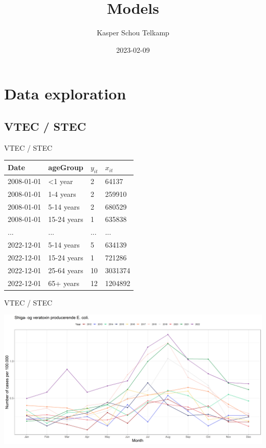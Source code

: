 \documentclass[aspectratio=169]{beamer}
\title[Automated and Early Detection of Disease Outbreaks]{Models}
\author{Kasper Schou Telkamp}
\institute{Section for Dynamical Systems}
\date{2023-02-09}
\begin{document}
\frame{
	\maketitle
}


\hypertarget{data-exploration}{%
\section{Data exploration}\label{data-exploration}}

\hypertarget{vtec-stec}{%
\subsection*{VTEC / STEC}\label{vtec-stec}}

\begin{frame}{VTEC / STEC}
\tiny

\begin{table}
\centering\begingroup\fontsize{12}{14}\selectfont

\begin{tabular}{llll}
\toprule
Date & ageGroup & $y_{it}$ & $x_{it}$\\
\midrule
2008-01-01 & <1 year & 2 & 64137\\
2008-01-01 & 1-4 years & 2 & 259910\\
2008-01-01 & 5-14 years & 2 & 680529\\
2008-01-01 & 15-24 years & 1 & 635838\\
... & ... & ... & ...\\
2022-12-01 & 5-14 years & 5 & 634139\\
2022-12-01 & 15-24 years & 1 & 721286\\
2022-12-01 & 25-64 years & 10 & 3031374\\
2022-12-01 & 65+ years & 12 & 1204892\\
\bottomrule
\end{tabular}
\endgroup{}
\end{table}

\normalsize
\end{frame}

\begin{frame}{VTEC / STEC}
\protect\hypertarget{vtec-stec-1}{}
\tiny

\includegraphics[width=1\linewidth]{../figures/EpixSTEC}

\normalsize
\end{frame}
\end{document}
